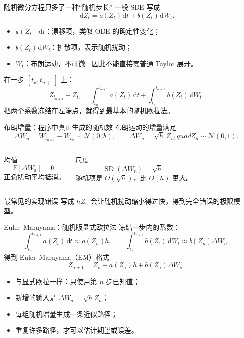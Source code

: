 \documentclass[aspectratio=169,10pt,fontset=none]{ctexbeamer}
\newcommand{\E}{\mathbb{E}}
\newcommand{\dd}{\,\mathrm{d}}
\newcommand{\Normal}{\mathcal{N}}
\begin{document}
\begin{frame}{随机微分方程只多了一种“随机步长”}
  一般 SDE 写成
  \[
    \boxed{\dd Z_t=a(Z_t)\dd t+b(Z_t)\dd W_t}.
  \]
  \begin{itemize}
    \item $a(Z_t)\dd t$：漂移项，类似 ODE 的确定性变化；
    \item $b(Z_t)\dd W_t$：扩散项，表示随机扰动；
    \item $W_t$：布朗运动，不可微，因此不能直接套普通 Taylor 展开。
  \end{itemize}
  在一步 $[t_n,t_{n+1}]$ 上：
  \[
    Z_{t_{n+1}}-Z_{t_n}
    =\int_{t_n}^{t_{n+1}}a(Z_t)\dd t
     +\int_{t_n}^{t_{n+1}}b(Z_t)\dd W_t.
  \]
  把两个系数冻结在左端点，就得到最基本的随机欧拉法。
\end{frame}

\begin{frame}{布朗增量：程序中真正生成的随机数}
  布朗运动的增量满足
  \[
    \Delta W_n=W_{t_{n+1}}-W_{t_n}\sim\Normal(0,h),
    \qquad \Delta W_n=\sqrt{h}\,Z_n,quad Z_n\sim\Normal(0,1).
  \]
  \begin{columns}[T]
    \begin{block}{均值}
      \[
        \E[\Delta W_n]=0.
      \]
      正负扰动平均抵消。
    \end{block}
    \begin{block}{尺度}
      \[
        \operatorname{SD}(\Delta W_n)=\sqrt h.
      \]
      随机项是 $O(\sqrt h)$，比 $O(h)$ 更大。
    \end{block}
  \end{columns}
  \begin{alertblock}{最常见的实现错误}
    写成 $hZ_n$ 会让随机扰动缩小得过快，得到完全错误的极限模型。
  \end{alertblock}
\end{frame}

\begin{frame}{Euler--Maruyama：随机版显式欧拉法}
  冻结一步内的系数：
  \[
    \int_{t_n}^{t_{n+1}}a(Z_t)\dd t\approx a(Z_n)h,
    \qquad
    \int_{t_n}^{t_{n+1}}b(Z_t)\dd W_t\approx b(Z_n)\Delta W_n.
  \]
  得到 Euler--Maruyama（EM）格式
  \[
    \boxed{Z_{n+1}=Z_n+a(Z_n)h+b(Z_n)\Delta W_n}.
  \]
  \begin{itemize}
    \item 与显式欧拉一样：只使用第 $n$ 步已知值；
    \item 新增的输入是 $\Delta W_n=\sqrt hZ_n$；
    \item 每组随机增量生成一条近似路径；
    \item 重复许多路径，才可以估计期望或误差。
  \end{itemize}
\end{frame}
\end{document}
